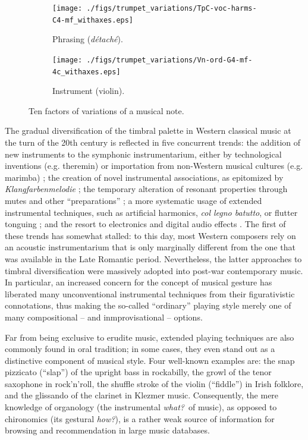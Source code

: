 \documentclass{article}
\makeatletter
\newcommand*{\eg}{e.g.\@\xspace}
\makeatother
\begin{document}
\begin{figure}
        \begin{subfigure}[b]{0.25\textwidth}
                \centering
                \texttt{[image: ./figs/trumpet\_variations/TpC-voc-harms-C4-mf\_withaxes.eps]}
                \caption{Phrasing (\emph{d\'{e}tach\'{e}}).}
                \label{fig:TpC+voc-harms-G4-mf_withaxes}
        \end{subfigure}%
        \begin{subfigure}[b]{0.25\textwidth}
                \centering
                \texttt{[image: ./figs/trumpet\_variations/Vn-ord-G4-mf-4c\_withaxes.eps]}
                \caption{Instrument (violin).}
                \label{fig:Vn-ord-G4-mf-4c}
        \end{subfigure}
        \caption{Ten factors of variations of a musical note.}\label{fig:trumpet-variations}
\end{figure}

The gradual diversification of the timbral palette in Western classical music at the turn of the 20th century is reflected in five concurrent trends:
the addition of new instruments to the symphonic instrumentarium, either by technological inventions (\eg theremin) or importation from non-Western musical cultures (\eg marimba) \cite{sachs2012book};
the creation of novel instrumental associations, as epitomized by \emph{Klangfarbenmelodie} \cite{schoenberg2010book};
the temporary alteration of resonant properties through mutes and other ``preparations'' \cite{dianova2007phd};
a more systematic usage of extended instrumental techniques, such as artificial harmonics, \emph{col legno batutto}, or flutter tonguing \cite{kostka2016book};
and the resort to electronics and digital audio effects \cite{zolzer2011dafx}.
The first of these trends has somewhat stalled: to this day, most Western composers rely on an acoustic instrumentarium that is only marginally different from the one that was available in the Late Romantic period.
Nevertheless, the latter approaches to timbral diversification were massively adopted into post-war contemporary music.
In particular, an increased concern for the concept of musical gesture \cite{godoy2009book} has liberated many unconventional instrumental techniques from their figurativistic connotations, thus making the so-called ``ordinary'' playing style merely one of many compositional -- and inmprovisational -- options.

Far from being exclusive to erudite music, extended playing techniques are also commonly found in oral tradition; in some cases, they even stand out as a distinctive component of musical style.
Four well-known examples are:
the snap pizzicato (``slap'') of the upright bass in rockabilly,
the growl of the tenor saxophone in rock'n'roll,
the shuffle stroke of the violin (``fiddle'') in Irish folklore,
and the glissando of the clarinet in Klezmer music.
Consequently, the mere knowledge of organology (the instrumental \emph{what?}~of music), as opposed to chironomics (its gestural \emph{how?}), is a rather weak source of information for browsing and recommendation in large music databases.
\end{document}

